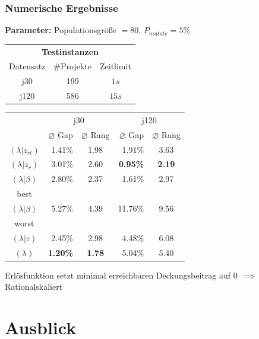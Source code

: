 \begin{frame}[t]
\frametitle{Numerische Ergebnisse}
\begin{footnotesize}
\textbf{Parameter:} Populationsgröße $=80$, $P_{mutate}=5\%$\\

\begin{center}
	\begin{tabular}{ccc}
		\multicolumn{3}{c}{\textbf{Testinstanzen}}\\
		Datensatz & \#Projekte & Zeitlimit\\
		j30 & 199 & $1s$\\
		j120 & 586 & $15s$
	\end{tabular}
\end{center}

\begin{center}	
\tabcolsep=0.16cm
\begin{tabular}{|c|rc|rc|}
	\hline
	\rule{0pt}{4mm} & \multicolumn{2}{c|}{j30} & \multicolumn{2}{c|}{j120}\\[1mm]
	 & $\varnothing$ Gap & $\varnothing$ Rang & $\varnothing$ Gap & $\varnothing$ Rang \\[3pt]
	\hline
   $(\lambda|z_{rt})$ & 1.41\% & 1.98 & 1.91\% & 3.63\\
	\hline
   $(\lambda|z_r)$ & 3.01\% & 2.60 & \textbf{0.95\%} & \textbf{2.19}\\
	\hline
	$(\lambda|\beta)$ & 2.80\% & 2.37 & 1.61\% & 2.97\\
	best & & & & \\
	\hline
	$(\lambda|\beta)$&5.27\% & 4.39 & 11.76\% & 9.56\\
	worst & & & & \\
	\hline
	$(\lambda|\tau)$&2.45\% & 2.98 & 4.48\% & 6.08\\
	\hline
	$(\lambda)$& \textbf{1.20\%} &\textbf{1.78} & 5.04\% & 5.40\\
	\hline
\end{tabular}
\end{center}

Erlösfunktion setzt minimal erreichbaren Deckungsbeitrag auf 0 $\implies$ Rationalskaliert

\end{footnotesize}	

\end{frame}

\section{Ausblick}

